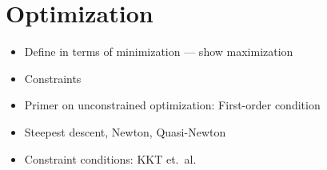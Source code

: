 \documentclass[main.tex]{subfiles}
\begin{document}
\section{Optimization}

\begin{itemize}
\item Define in terms of minimization --- show maximization
\item Constraints
\item Primer on unconstrained optimization: First-order condition
\item Steepest descent, Newton, Quasi-Newton
\item Constraint conditions: KKT et.\ al.
\end{itemize}

\biblio{} %
\end{document}
